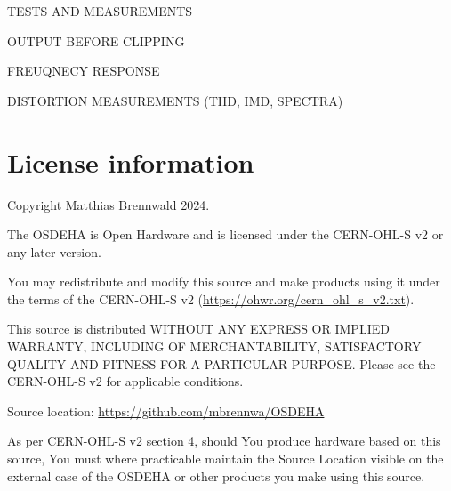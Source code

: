 TESTS AND MEASUREMENTS

OUTPUT BEFORE CLIPPING

FREUQNECY RESPONSE

DISTORTION MEASUREMENTS (THD, IMD, SPECTRA)


\section{License information} 
Copyright Matthias Brennwald 2024.                                                    

The OSDEHA is Open Hardware and is licensed under the CERN-OHL-S v2 or any later version.

You may redistribute and modify this source and make products using it under the terms of the CERN-OHL-S v2 (\url{https://ohwr.org/cern_ohl_s_v2.txt}).

This source is distributed WITHOUT ANY EXPRESS OR IMPLIED WARRANTY, INCLUDING OF MERCHANTABILITY, SATISFACTORY QUALITY AND FITNESS FOR A PARTICULAR PURPOSE. Please see the CERN-OHL-S v2 for applicable conditions.

Source location: \url{https://github.com/mbrennwa/OSDEHA}

As per CERN-OHL-S v2 section 4, should You produce hardware based on this source, You must where practicable maintain the Source Location visible on the external case of the OSDEHA or other products you make using this source.            






